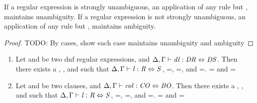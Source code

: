 \begin{lemma}
If a regular expression is strongly unambiguous, an application of any rule but
\StarstarRule{}, maintains unambiguity.
If a regular expression is not strongly unambiguous, an application of any rule
but \StarstarRule{}, maintains ambiguity.
\end{lemma}
\begin{proof}
TODO: By cases, show each case maintains unambiguity and ambiguity
\end{proof}

\begin{lemma}\leavevmode
\label{lem:dnfcal}
\begin{enumerate}
\item Let \DNFRegex{} and \DNFRegexAlt{} be two dnf regular expressions, and $\Delta, \Gamma \vdash \mathit{dl} : \mathit{DR} \Leftrightarrow \mathit{DS}$.  Then there exists a \Lens{}, \Regex{}, and \RegexAlt{} such that $\Delta, \Gamma \vdash \mathit{l} : \mathit{R} \Leftrightarrow \mathit{S}$, \PutRightOf{\Lens}=\PutRightOf{\DNFLens}, \LanguageOf{\Regex}=\LanguageOf{\DNFRegex}, and \LanguageOf{\RegexAlt}=\LanguageOf{\DNFRegexAlt}.  \LanguageOf{\Regex{}} = \LanguageOf{\DNFRegex{}} and
\LanguageOf{\RegexAlt{}} = \LanguageOf{\DNFRegexAlt{}}

\item Let \Sequence{} and \SequenceAlt{} be two clauses, and $\Delta, \Gamma \vdash \mathit{col} : \mathit{CO} \Leftrightarrow \mathit{BO}$.  Then there exists a \Lens{}, \Regex{}, and \RegexAlt{} such that $\Delta, \Gamma \vdash \mathit{l} : \mathit{R} \Leftrightarrow \mathit{S}$, \PutRightOf{\Lens}=\PutRightOf{\SequenceLens}, \LanguageOf{\Regex}=\LanguageOf{\Sequence}, and \LanguageOf{\RegexAlt}=\LanguageOf{\SequenceAlt}.  \LanguageOf{\Regex{}} = \LanguageOf{\Sequence{}} and
\LanguageOf{\RegexAlt{}} = \LanguageOf{\SequenceAlt{}}


\end{enumerate}
\end{lemma}
